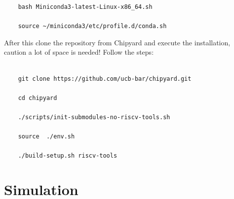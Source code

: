 \documentclass{article}
\begin{document}
{\begin{verbatim}
    bash Miniconda3-latest-Linux-x86_64.sh

    source ~/miniconda3/etc/profile.d/conda.sh
\end{verbatim}
After this clone the repository from Chipyard and execute the installation, caution a lot of space is needed! Follow the steps:\\\\
\begin{verbatim}
    git clone https://github.com/ucb-bar/chipyard.git
	
	cd chipyard
	
	./scripts/init-submodules-no-riscv-tools.sh 
	
	source  ./env.sh
	
	./build-setup.sh riscv-tools
\end{verbatim}


\section*{Simulation}
}
\end{document}

